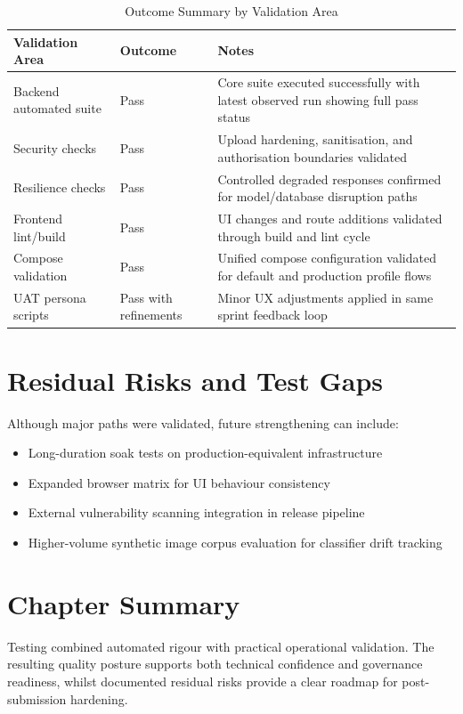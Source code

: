 \begin{table}[H]
\centering
\begin{tabularx}{\textwidth}{|>{\RaggedRight\arraybackslash}X|>{\RaggedRight\arraybackslash}X|>{\RaggedRight\arraybackslash}X|}
\hline
\textbf{Validation Area} & \textbf{Outcome} & \textbf{Notes} \\ \hline
Backend automated suite & Pass & Core suite executed successfully with latest observed run showing full pass status \\ \hline
Security checks & Pass & Upload hardening, sanitisation, and authorisation boundaries validated \\ \hline
Resilience checks & Pass & Controlled degraded responses confirmed for model/database disruption paths \\ \hline
Frontend lint/build & Pass & UI changes and route additions validated through build and lint cycle \\ \hline
Compose validation & Pass & Unified compose configuration validated for default and production profile flows \\ \hline
UAT persona scripts & Pass with refinements & Minor UX adjustments applied in same sprint feedback loop \\ \hline
\end{tabularx}
\caption{Outcome Summary by Validation Area}
\end{table}

\section{Residual Risks and Test Gaps}

Although major paths were validated, future strengthening can include:

\begin{itemize}
\item Long-duration soak tests on production-equivalent infrastructure
\item Expanded browser matrix for UI behaviour consistency
\item External vulnerability scanning integration in release pipeline
\item Higher-volume synthetic image corpus evaluation for classifier drift tracking
\end{itemize}

\section{Chapter Summary}

Testing combined automated rigour with practical operational validation. The resulting quality posture supports both technical confidence and governance readiness, whilst documented residual risks provide a clear roadmap for post-submission hardening.

